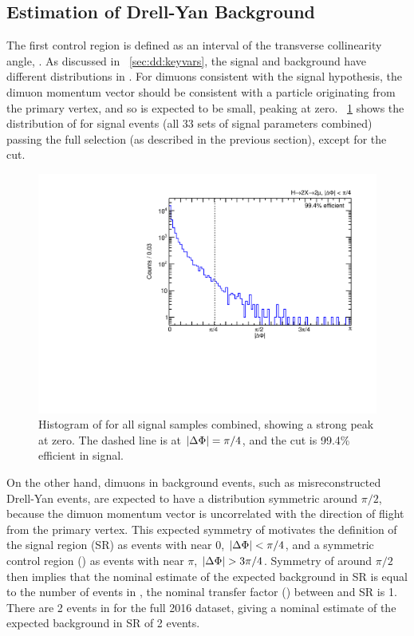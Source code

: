 \subsection{Estimation of Drell-Yan Background}
The first control region is defined as an interval of the transverse collinearity angle, \DeltaPhi.
As discussed in \Sec~\ref{sec:dd:keyvars}, the signal and background have different distributions in \DeltaPhi.
For dimuons consistent with the signal hypothesis, the dimuon momentum vector should be consistent with a particle originating from the primary vertex, and so \DeltaPhi is expected to be small, peaking at zero.
\Fig~\ref{fig:dd:deltaPhi_Sig} shows the distribution of \DeltaPhi for \twoMu signal events (all 33 sets of signal parameters combined) passing the full selection (as described in the previous section), except for the \DeltaPhi cut.

\begin{figure}[htpb]
  \centering
  \includegraphics[width=\DFigWidth]{figures/displaced/NM1_2Mu2J_deltaPhi.pdf}
  \caption[Histogram of \DeltaPhi for all \twoMu signal samples combined, showing a strong peak at zero.]{Histogram of \DeltaPhi for all \twoMu signal samples combined, showing a strong peak at zero. The dashed line is at $|\Delta\Phi| = \pi/4$, and the cut is 99.4\% efficient in signal.}
  \label{fig:dd:deltaPhi_Sig}
\end{figure}

On the other hand, dimuons in background events, such as misreconstructed Drell-Yan events, are expected to have a \DeltaPhi distribution symmetric around $\pi/2$, because the dimuon momentum vector is uncorrelated with the direction of flight from the primary vertex.
This expected symmetry of \DeltaPhi motivates the definition of the signal region (SR) as events with \DeltaPhi near 0, \ie $|\Delta\Phi| < \pi/4$, and a symmetric control region (\CR{ }{\pi}) as events with \DeltaPhi near $\pi$, \ie $|\Delta\Phi| > 3\pi/4$.
Symmetry of \DeltaPhi around $\pi/2$ then implies that the nominal estimate of the expected background in SR is equal to the number of events in \CR{ }{\pi}, \ie the nominal transfer factor (\TF) between \CR{ }{\pi} and SR is 1.
There are 2 events in \CR{ }{\pi} for the full 2016 dataset, giving a nominal estimate of the expected background in SR of 2 events.

